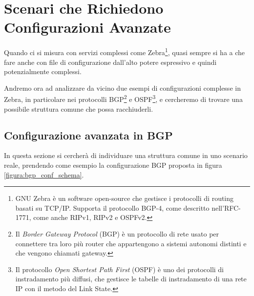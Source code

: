 \section{Scenari che Richiedono Configurazioni Avanzate}
Quando ci si misura con servizi complessi come Zebra\footnote{GNU Zebra è un software open-source che gestisce i protocolli di routing basati su TCP/IP. Supporta il protocollo BGP-4, come descritto nell'RFC-1771, come anche RIPv1, RIPv2 e OSPFv2.}, quasi sempre si ha a che fare anche con file di configurazione dall'alto potere espressivo e quindi potenzialmente complessi.

Andremo ora ad analizzare da vicino due esempi di configurazioni complesse in Zebra, in particolare nei protocolli BGP\footnote{Il \emph{Border Gateway Protocol} (BGP) è un protocollo di rete usato per connettere tra loro più router che appartengono a sistemi autonomi distinti e che vengono chiamati gateway.} e OSPF\footnote{Il protocollo \emph{Open Shortest Path First} (OSPF) è uno dei protocolli di instradamento più diffusi, che gestisce le tabelle di instradamento di una rete IP con il metodo del Link State.}, e cercheremo di trovare una possibile struttura comune che possa racchiuderli.

\subsection{Configurazione avanzata in BGP}
In questa sezione si cercherà di individuare una struttura comune in uno scenario reale, prendendo come esempio la configurazione BGP proposta in figura \ref{figura:bgp_conf_schema}.

